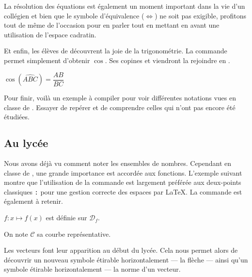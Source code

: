 La résolution des équations est également un moment important dans la vie d'un collégien et bien que le symbole d'équivalence ($\Leftrightarrow$) ne soit pas exigible, profitons tout de même de l'occasion pour en parler tout en mettant en avant une utilisation de l'espace cadratin.


Et enfin, les élèves de  découvrent la joie de la trigonométrie. La commande  permet simplement d'obtenir $\cos$. Ses copines  et  viendront la rejoindre en .\bigskip

{\NewFont
\begin{SideBySideExample}
    $\cos\left(\widehat{ABC}\right) = \dfrac{AB}{BC}$
\end{SideBySideExample}
}\bigskip

Pour finir, voilà un exemple à compiler pour voir différentes notations vues en classe de . Essayer de repérer et de comprendre celles qui n'ont pas encore été étudiées.


\subsection{Au lycée}

Nous avons déjà vu comment noter les ensembles de nombres. Cependant en classe de , une grande importance est accordée aux fonctions. L'exemple suivant montre que l'utilisation de la commande  est largement préférée aux deux-points classiques \verb!:! pour une gestion correcte des espaces par \LaTeX. La commande  est également à retenir.\bigskip

{\NewFont
\begin{SideBySideExample}
    $f\colon x \mapsto f(x)$ est d\'efinie sur
                                          $\mathcal D_f$.

    On note $\mathcal C$ sa courbe repr\'esentative.
\end{SideBySideExample}
}\bigskip

Les vecteurs font leur apparition au début du lycée. Cela nous permet alors de découvrir un nouveau symbole étirable horizontalement --- la flèche --- ainsi qu'un symbole étirable horizontalement --- la norme d'un vecteur.

